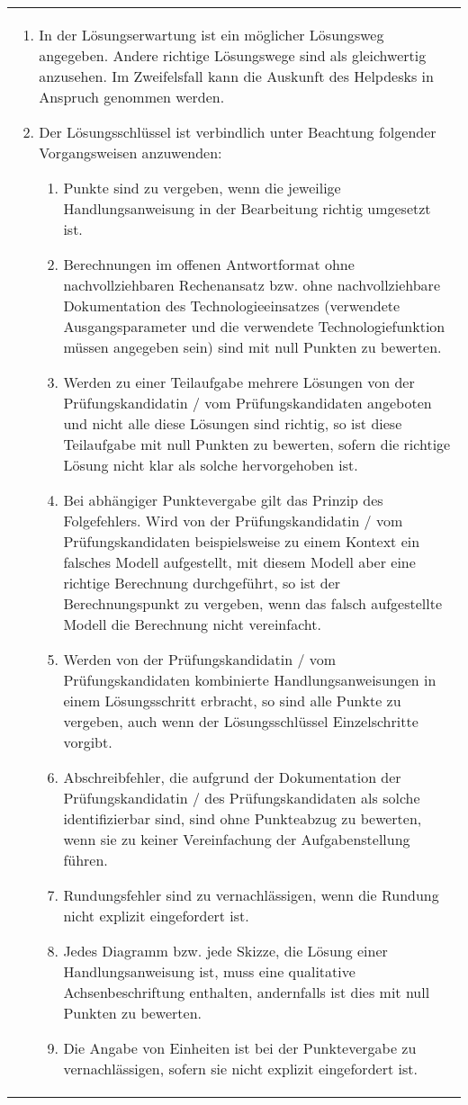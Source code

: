 \documentclass[10pt,a4paper]{article}
\begin{document}
{\begin{tabular}{p{14cm}}
{\begin{enumerate}
\item In der Lösungserwartung ist ein möglicher Lösungsweg angegeben. Andere richtige Lösungswege sind als gleichwertig anzusehen. Im Zweifelsfall kann die Auskunft des Helpdesks in Anspruch genommen werden.
\item Der Lösungsschlüssel ist verbindlich unter Beachtung folgender Vorgangsweisen anzuwenden:
  \begin{enumerate}[label=\alph*)]
    \item Punkte sind zu vergeben, wenn die jeweilige Handlungsanweisung in der Bearbeitung richtig umgesetzt ist.
    \item Berechnungen im offenen Antwortformat ohne nachvollziehbaren Rechenansatz bzw. ohne nachvollziehbare Dokumentation des Technologieeinsatzes (verwendete Ausgangsparameter und die verwendete Technologiefunktion müssen angegeben sein) sind mit null Punkten zu bewerten.
    \item Werden zu einer Teilaufgabe mehrere Lösungen von der Prüfungskandidatin / vom Prüfungskandidaten angeboten und nicht alle diese Lösungen sind richtig, so ist diese Teilaufgabe mit null Punkten zu bewerten, sofern die richtige Lösung nicht klar als solche hervorgehoben ist.
    \item Bei abhängiger Punktevergabe gilt das Prinzip des Folgefehlers. Wird von der Prüfungskandidatin / vom Prüfungskandidaten beispielsweise zu einem Kontext ein falsches Modell aufgestellt, mit diesem Modell aber eine richtige Berechnung durchgeführt, so ist der Berechnungspunkt zu vergeben, wenn das falsch aufgestellte Modell die Berechnung nicht vereinfacht.
    \item Werden von der Prüfungskandidatin / vom Prüfungskandidaten kombinierte Handlungsanweisungen in einem Lösungsschritt erbracht, so sind alle Punkte zu vergeben, auch wenn der Lösungsschlüssel Einzelschritte vorgibt.
    \item Abschreibfehler, die aufgrund der Dokumentation der Prüfungskandidatin / des Prüfungskandidaten als solche identifizierbar sind, sind ohne Punkteabzug zu bewerten, wenn sie zu keiner Vereinfachung der Aufgabenstellung führen.
    \item Rundungsfehler sind zu vernachlässigen, wenn die Rundung nicht explizit eingefordert ist.
    \item Jedes Diagramm bzw. jede Skizze, die Lösung einer Handlungsanweisung ist, muss eine qualitative Achsenbeschriftung enthalten, andernfalls ist dies mit null Punkten zu bewerten.
    \item Die Angabe von Einheiten ist bei der Punktevergabe zu vernachlässigen, sofern sie nicht explizit eingefordert ist.
  \end{enumerate}
\end{enumerate}

}

\end{tabular}

\vspace*{1cm}

}

\newpage

\begin{enumerate}


\end{enumerate}
\end{document}
